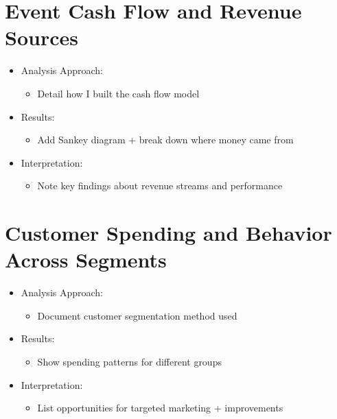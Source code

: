 \section{Event Cash Flow and Revenue Sources}
\label{sec:data-analysis-event-cash-flow}
\begin{itemize}
    \item Analysis Approach:
    \begin{itemize}
        \item Detail how I built the cash flow model
    \end{itemize}

    \item Results:
    \begin{itemize}
        \item Add Sankey diagram + break down where money came from
    \end{itemize}

    \item Interpretation:
    \begin{itemize}
        \item Note key findings about revenue streams and performance
    \end{itemize}
\end{itemize}


\section{Customer Spending and Behavior Across Segments}
\label{sec:data-analysis-customer-spending}
\begin{itemize}
    \item Analysis Approach:
    \begin{itemize}
        \item Document customer segmentation method used
    \end{itemize}

    \item Results:
    \begin{itemize}
        \item Show spending patterns for different groups
    \end{itemize}

    \item Interpretation:
    \begin{itemize}
        \item List opportunities for targeted marketing + improvements
    \end{itemize}
\end{itemize}


